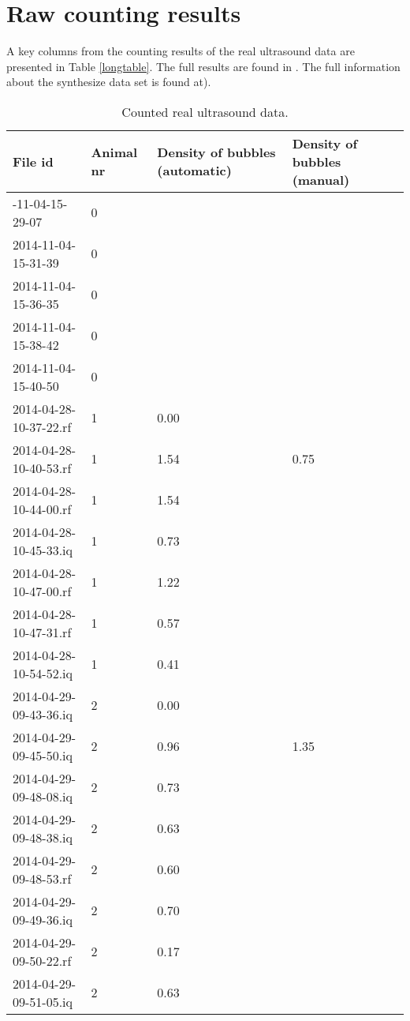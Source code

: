 \section{Raw counting results}
\label{raw counting}
A key columns from the counting results of the real ultrasound data are presented in Table \ref{longtable}. The full results are found in . The full information about the synthesize data set is found at).

%
\begin{center}
	\begin{longtable}{@{}l p{1cm} p{3cm} p{3cm} @{}}
		\caption{Counted real ultrasound data.}\label{counting sheet}\\
		\toprule
		File id & Animal nr & Density of bubbles (automatic) & Density of bubbles (manual) \\ 
		\midrule \endhead
		\bottomrule\endfoot
		2014-11-04-15-29-07 & 0 &  &  \\ 
		2014-11-04-15-31-39 & 0 &  &  \\ 
		2014-11-04-15-36-35 & 0 &  &  \\ 
		2014-11-04-15-38-42 & 0 &  &  \\ 
		2014-11-04-15-40-50 & 0 &  &  \\ 
		2014-04-28-10-37-22.rf & 1 & 0.00 &  \\ 
		2014-04-28-10-40-53.rf & 1 & 1.54 & 0.75 \\ 
		2014-04-28-10-44-00.rf & 1 & 1.54 &  \\ 
		2014-04-28-10-45-33.iq & 1 & 0.73 &  \\ 
		2014-04-28-10-47-00.rf & 1 & 1.22 &  \\ 
		2014-04-28-10-47-31.rf & 1 & 0.57 &  \\ 
		2014-04-28-10-54-52.iq & 1 & 0.41 &  \\ 
		2014-04-29-09-43-36.iq & 2 & 0.00 &  \\ 
		2014-04-29-09-45-50.iq & 2 & 0.96 & 1.35 \\ 
		2014-04-29-09-48-08.iq & 2 & 0.73 &  \\ 
		2014-04-29-09-48-38.iq & 2 & 0.63 &  \\ 
		2014-04-29-09-48-53.rf & 2 & 0.60 &  \\ 
		2014-04-29-09-49-36.iq & 2 & 0.70 &  \\ 
		2014-04-29-09-50-22.rf & 2 & 0.17 &  \\ 
		2014-04-29-09-51-05.iq & 2 & 0.63 &  \\ 

\end{longtable}
\end{center}
